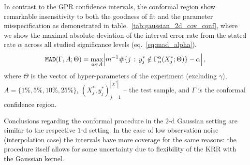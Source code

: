 \documentclass[a4paper,14pt]{extarticle}
\begin{document}
In contrast to the GPR confidence intervals, the conformal region show remarkable
insensitivity to both the goodness of fit and the parameter misspecification
as demonstrated in table.~\ref{tab:gaussian_2d_cov_conf}, where we show the maximal
absolute deviation of the interval error rate from the stated rate $\alpha$
across all studied significance levels (eq.~\ref{eq:mad_alpha}).
\begin{equation} \label{eq:mad_alpha}
  \mathtt{MAD}(\Gamma, A; \Theta)
  = \max_{\alpha\in A}\Bigl\lvert
    m^{-1}\#\{j\,:\, y^*_j\notin \Gamma^\alpha_n(X^*_j; \Theta)\} - \alpha
  \Bigr\rvert
    \,,
\end{equation}
where $\Theta$ is the vector of hyper-parameters of the experiment (excluding $\gamma$),
$A = \{1\%, 5\%, 10\%, 25\%\}$, $(X^*_j, y^*_j)_{j=1}^{|X^*|}$ -- the test sample, and
$\Gamma$ is the conformal confidence region.

Conclusions regarding the conformal procedure in the $2$-d Gaussian setting are
similar to the respective $1$-d setting. In the case of low observation noise (interpolation
case) the intervals have more coverage for the same reasons: the procedure itself
allows for some uncertainty due to flexibility of the KRR with the Gaussian kernel.
\end{document}
